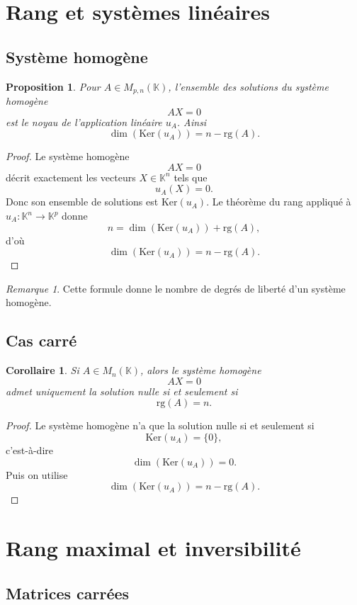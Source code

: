 \documentclass[11pt,a4paper]{article}
\newtheorem{proposition}[definition]{Proposition}
\newtheorem{corollaire}[definition]{Corollaire}
\theoremstyle{remark}
\newtheorem{remarque}[definition]{Remarque}
\newcommand{\K}{\mathbb{K}}
\newcommand{\Ker}{\mathrm{Ker}}
\newcommand{\rg}{\mathrm{rg}}
\begin{document}
\section{Rang et systèmes linéaires}

\subsection{Système homogène}

\begin{proposition}
Pour \(A\in M_{p,n}(\K)\), l’ensemble des solutions du système homogène
\[
AX=0
\]
est le noyau de l’application linéaire \(u_A\). Ainsi
\[
\dim(\Ker(u_A))=n-\rg(A).
\]
\end{proposition}

\begin{proof}
Le système homogène
\[
AX=0
\]
décrit exactement les vecteurs \(X\in \K^n\) tels que
\[
u_A(X)=0.
\]
Donc son ensemble de solutions est \(\Ker(u_A)\). Le théorème du rang appliqué à \(u_A:\K^n\to\K^p\) donne
\[
n=\dim(\Ker(u_A))+\rg(A),
\]
d’où
\[
\dim(\Ker(u_A))=n-\rg(A).
\]
\end{proof}

\begin{remarque}
Cette formule donne le nombre de degrés de liberté d’un système homogène.
\end{remarque}

\subsection{Cas carré}

\begin{corollaire}
Si \(A\in M_n(\K)\), alors le système homogène
\[
AX=0
\]
admet uniquement la solution nulle si et seulement si
\[
\rg(A)=n.
\]
\end{corollaire}

\begin{proof}
Le système homogène n’a que la solution nulle si et seulement si
\[
\Ker(u_A)=\{0\},
\]
c’est-à-dire
\[
\dim(\Ker(u_A))=0.
\]
Puis on utilise
\[
\dim(\Ker(u_A))=n-\rg(A).
\]
\end{proof}

\section{Rang maximal et inversibilité}

\subsection{Matrices carrées}
\end{document}
